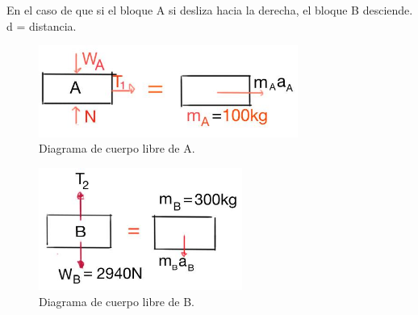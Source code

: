 \documentclass[a4paper,11pt]{scrartcl}
\begin{document}
\begin{center}

En el caso de que si el bloque A si desliza hacia la derecha, el bloque B desciende.\\
d = distancia.\\

\begin{figure}[H]
  \centering
  \includegraphics[height=3cm]{20_2}
  \caption{Diagrama de cuerpo libre de A.}
  \label{fig:20_2}
\end{figure}

\begin{figure}[H]
  \centering
  \includegraphics[height=4cm]{20_3}
  \caption{Diagrama de cuerpo libre de B.}
  \label{fig:20_3}
\end{figure}


\end{center}
\end{document}
